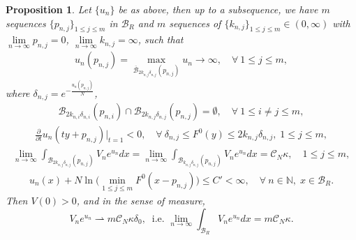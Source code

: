 \documentclass[11pt]{amsart}
\numberwithin{equation}{section}
\newtheorem{prop}[thm]{Proposition}
\newcommand{\N}{\mathbb{N}}
\begin{document}
\begin{prop}\label{pro3.1}
Let $\{u_{n}\}$ be as above, then up to a subsequence, we have $m$ sequences $\{p_{n, j}\}_{1\le j \le m}$ in $\mathcal{B}_{R}$ and $m$ sequences of $\{k_{n, j}\}_{1\le j \le m} \in (0, \infty)$ with $\lim\limits_{n\rightarrow\infty}p_{n, j}=0$, $\lim\limits_{n\rightarrow\infty}k_{n, j}=\infty$, such that
\begin{align}\label{l4.2.1}
u_{n}(p_{n, j})=\max_{\overline{\mathcal B}_{2k_{n, j}\delta_{n, j}}(p_{n, j})}u_{n}\rightarrow\infty, \quad\forall~ 1\leq j\leq m,
\end{align}
where $\delta_{n, j}=e^{-\frac{u_{n}(p_{n, j})}{N}}$,
\begin{align}\label{l4.2.2}
\mathcal{B}_{2k_{n,i}\delta_{n,i}}(p_{n,i})\cap \mathcal{B}_{2k_{n, j}\delta_{n, j}}(p_{n, j})=\emptyset, \quad\forall ~1\leq i \ne j\leq m,
\end{align}
\begin{align}\label{l4.2.3}
\frac{\partial}{\partial t}u_{n}(ty+p_{n, j})|_{t=1}<0, \quad \forall ~\delta_{n, j}\leq F^{0}(y)\leq 2k_{n, j}\delta_{n, j},\; 1\leq j\leq m,
\end{align}
\begin{align}\label{l4.2.4}
\lim_{n\rightarrow\infty}\int_{\mathcal{B}_{2k_{n, j}\delta_{n, j}}(p_{n, j})}V_{n}e^{u_{n}}dx=\lim_{n\rightarrow\infty}\int_{\mathcal{B}_{k_{n, j}\delta_{n, j}}(p_{n, j})}V_{n}e^{u_{n}}dx=\mathcal{C}_{N}\kappa, \quad 1\leq j\leq m,
\end{align}
\begin{align}\label{l4.2.5}
u_{n}(x)+N\ln\Big(\min_{1\leq j\leq m}F^{0}(x-p_{n, j})\Big)\leq C' < \infty, \quad \forall ~n \in \N,\; x \in \mathcal{B}_R.
\end{align}
Then $V(0) > 0$, and in the sense of measure,
 $$V_{n}e^{u_{n}}\rightharpoonup m\mathcal{C}_{N}\kappa\delta_{0}, \;\; \mbox{i.e. } \lim_{n\to\infty}\int_{\mathcal{B}_{R}}V_{n}e^{u_{n}}dx = m\mathcal{C}_{N}\kappa.$$
\end{prop}
\end{document}
